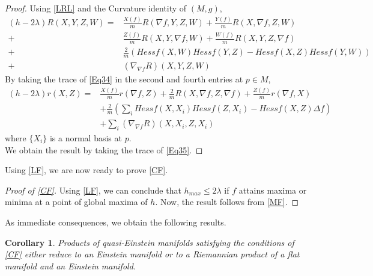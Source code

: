 \documentclass[12pt]{amsart}
\newtheorem{corollary}[theorem]{Corollary}
\theoremstyle{definition}
\numberwithin{equation}{section}
\begin{document}
\begin{proof}
        Using \cref{LRL} and the Curvature identity of $(M,g)$,
        {\small
        \begin{align}\label{Eq34}
            (h-2\lambda)R(X,Y,Z,W) = &\frac{X(f)}{m}R(\nabla f,Y,Z,W) + \frac{Y(f)}{m}R(X,\nabla f,Z,W)\nonumber\\ +& \frac{Z(f)}{m}R(X,Y,\nabla f,W)  + \frac{W(f)}{m}R(X,Y,Z,\nabla f)\\  +& \frac{2}{m}(Hessf(X,W)Hessf(Y,Z)-Hessf(X,Z)Hessf(Y,W))\nonumber \\ +&  (\nabla_{\nabla f}R)(X,Y,Z,W)\nonumber     
            \end{align}}
    By taking the trace of \cref{Eq34} in the second and fourth entries at $p \in M$,
    \allowdisplaybreaks
    {
    {\small
        \begin{align}\label{Eq35}
            (h-2\lambda)r(X,Z) = & \frac{X(f)}{m}r(\nabla f,Z) + \frac{2}{m}R(X,\nabla f,Z,\nabla f) + \frac{Z(f)}{m}r(\nabla f,X)\nonumber\\& + \frac{2}{m}(\sum_{i}Hessf(X,X_{i})Hessf(Z,X_{i}) - Hessf(X,Z)\Delta f)\\& + \sum_{i}(\nabla_{\nabla f}R)(X,X_{i},Z,X_{i})\nonumber
       \end{align}}}
       where $\{X_{i}\}$ is a normal basis at $p$.\\
    We obtain the result by taking the trace of \cref{Eq35}.
\end{proof}
\noindent Using \cref{LF}, we are now ready to prove \cref{CF}.
  \begin{proof}[Proof of \cref{CF}]
 Using \cref{LF}, we can conclude that $h_{max} \leq 2\lambda$ if $f$ attains maxima or minima at a point of global maxima of $h$. Now, the result follows from \cref{MF}.
       \end{proof}
As immediate consequences, we obtain the following results.
\begin{corollary}
 Products of quasi-Einstein manifolds satisfying the conditions of \cref{CF} either reduce to an Einstein manifold or to a Riemannian product of a flat manifold and an Einstein manifold.   
\end{corollary}
\end{document}
